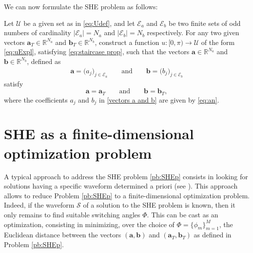 \documentclass[twocolumn]{autart}    %
\begin{document}
We can now formulate the SHE problem as follows:
\newline
\begin{problem}[SHE]\label{pb:SHEp}
Let $\mathcal{U}$ be a given set as in \eqref{eq:Udef}, and let $\mathcal{E} _a $ and $\mathcal{E} _b $ be two finite sets of odd numbers of cardinality $|\mathcal{E}_a| = N_a $ and $ |\mathcal{E} _b| = N_b$ respectively. For any two given vectors $\bm{a}_T \in \mathbb{R}^{N_a}$ and $\bm{b}_T \in \mathbb{R}^{N_b} $, construct a function $u: [0,\pi)\to\mathcal{U}$ of the form \eqref{eq:uExpl}, satisfying \eqref{eq:staircase prop}, such that the vectors $\bm{a} \in \mathbb{R}^{N_a}$ and $\bm{b} \in \mathbb{R}^{N_b}$, defined as
\begin{align}\label{vectors a and b}
\bm{a} = \big( a_j \big)_{j\in \mathcal{E}_a} \qquad \text{and} \qquad
\bm{b} = \big( b_j \big)_{j\in \mathcal{E}_b}
\end{align}
satisfy
$$
\bm{a} = \bm{a}_T \qquad \text{and} \qquad \bm{b} = \bm{b}_T,
$$
where the coefficients $a_j$ and $b_j$ in \eqref{vectors a and b} are given by \eqref{eq:an}.
\end{problem} 


\section{SHE as a finite-dimensional optimization problem}\label{sec:SHE_finite-dim_pbm}

A typical approach to address the SHE problem \eqref{pb:SHEp} consists in looking for solutions having a specific waveform determined a priori (see \cite{Yang2015,Konstantinou2010,Sun1996}).
This approach allows to reduce Problem \ref{pb:SHEp} to a finite-dimensional optimization problem.
Indeed, if the waveform $\mathcal S$ of a solution to the SHE problem is known,  then it only remains to find suitable switching angles $\Phi$. This can be cast as an optimization, consisting in minimizing, over the choice of $\Phi = \{\phi_m\}_{m=1}^{M}$,  the Euclidean distance between the  vectors $(\bm{a}, \bm{b})$
and 
$(\bm{a}_T,\bm{b}_T)$ as defined in Problem \ref{pb:SHEp}.
\end{document}
